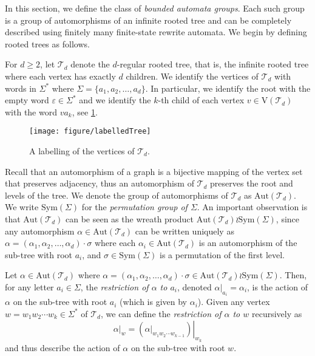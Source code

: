 In this section, we define the class of \emph{bounded automata groups}.
Each such group is a group of automorphisms of an infinite rooted tree and can be completely described using finitely many finite-state rewrite automata.
We begin by defining rooted trees as follows.

For $d \geq 2$, let $\mathcal{T}_d$ denote the $d$-regular rooted tree, that is, the infinite rooted tree where each vertex has exactly $d$ children.
We identify the vertices of $\mathcal{T}_d$ with words in $\Sigma^*$ where $\Sigma = \{ a_1, a_2, \ldots, a_d \}$.
In particular, we identify the root with the empty word $\varepsilon \in \Sigma^*$ and we identify the $k$-th child of each vertex $v \in \mathrm{V}(\mathcal{T}_d)$ with the word $v a_k$, see \cref{fig:tree-vertex-labelling}.

\begin{figure}[h!t]
	\centering
	\texttt{[image: figure/labelledTree]}
	\caption{A labelling of the vertices of $\mathcal{T}_d$.}
	\label{fig:tree-vertex-labelling}
\end{figure}

Recall that an automorphism of a graph is a bijective mapping of the vertex set that preserves adjacency, thus an automorphism of $\mathcal{T}_d$ preserves the root and levels of the tree.
We denote the group of automorphisms of $\mathcal{T}_d$ as $\mathrm{Aut}(\mathcal{T}_d)$.
We write $\mathrm{Sym}(\Sigma)$ for the \emph{permutation group of $\Sigma$}.
An important observation  is that $\mathrm{Aut}(\mathcal{T}_d)$ can be seen as the wreath product $\mathrm{Aut}(\mathcal{T}_d) \wr \mathrm{Sym}(\Sigma)$, since any automorphism $\alpha \in \mathrm{Aut}(\mathcal{T}_d)$ can be written uniquely as $\alpha = (\alpha_1, \alpha_2, \ldots, \alpha_d) \cdot \sigma$ where each $\alpha_i \in \mathrm{Aut}(\mathcal{T}_d)$ is an automorphism of the sub-tree with root $a_i$, and $\sigma \in \mathrm{Sym}(\Sigma)$ is a permutation  of the first level.

Let $\alpha \in \mathrm{Aut}(\mathcal{T}_d)$ where $\alpha = (\alpha_1, \alpha_2, \ldots, \alpha_d) \cdot \sigma \in \mathrm{Aut}(\mathcal{T}_d) \wr \mathrm{Sym}(\Sigma)$.
Then, for any letter $a_i \in \Sigma$, the \emph{restriction of $\alpha$ to $a_i$}, denoted $\left.\alpha\right\vert_{a_i} = \alpha_i$, is the action of $\alpha$ on the sub-tree with root $a_i$ (which is given by $\alpha_i$).
Given any vertex $w = w_1 w_2 \cdots w_k \in \Sigma^*$ of $\mathcal{T}_d$, we can define the \emph{restriction of $\alpha$ to $w$} recursively as
\[
	\left.\alpha\right\vert_w
	=
	\left.
		\left(\left.\alpha\right\vert_{w_1w_2\cdots w_{k-1}}\right)
	\right\vert_{w_k}
\]
and thus describe the action of $\alpha$ on the sub-tree with root $w$.

